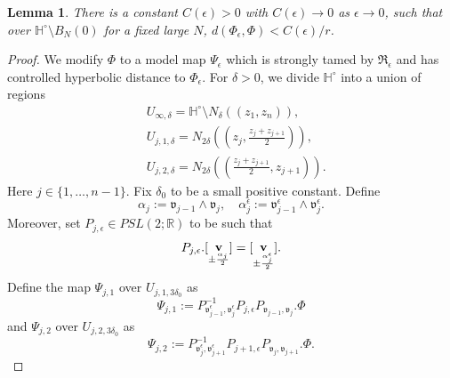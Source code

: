 \documentclass[a4paper,11pt]{amsart}
\newtheorem{lemma}[theorem]{Lemma}
\theoremstyle{definition}
\numberwithin{equation}{section}
\newcommand{\R}{\mathbb{R}}
\newcommand{\mv} {\mathfrak v}
\newcommand{\mR} {\mathfrak R}
\DeclareMathOperator{\bv}{{\bf v}}
\begin{document}
\begin{lemma}\label{lem:finer control on Phi epsilon}
    There is a constant $C(\epsilon)>0$ with $C(\epsilon)\to0$ as $\epsilon\to0$, such that over $\mathbb{H}^\circ\setminus B_{N}(0)$ for a fixed large $N$, $d(\Phi_\epsilon,\Phi)<C(\epsilon)/r$.
\end{lemma}
\begin{proof}
    We modify $\Phi$ to a model map $\Psi_{\epsilon}$ which is strongly tamed by $\mR_\epsilon$ and has controlled hyperbolic distance to $\Phi_\epsilon$. For $\delta>0$, we divide $\mathbb{H}^\circ$ into a union of regions
    \begin{align*}
        &U_{\infty,\delta}=\mathbb{H}^\circ\setminus N_{\delta}((z_1,z_n)),\\
        &U_{j,1,\delta}=N_{2\delta}((z_j,\frac{z_j+z_{j+1}}{2})),\\
        &U_{j,2,\delta}=N_{2\delta}((\frac{z_j+z_{j+1}}{2},z_{j+1})).
    \end{align*}
    Here $j\in\{1,\ldots,n-1\}$. Fix $\delta_0$ to be a small positive constant. Define 
    $$\alpha_j:=\mv_{j-1}\wedge \mv_j,\quad \alpha_j^\epsilon:=\mv_{j-1}^\epsilon\wedge \mv_j^\epsilon.$$
    Moreover, set $P_{j,\epsilon}\in PSL(2;\R)$ to be such that  
    $$P_{j,\epsilon}.[\bv_{\pm\frac{\alpha_j}{2}}]=[\bv_{\pm\frac{\alpha_j^\epsilon}{2}}].$$
    Define the map $\Psi_{j,1}$ over $U_{j,1,3\delta_0}$ as 
    $$\Psi_{j,1}:=P_{\mv_{j-1}^\epsilon,\mv_j^\epsilon}^{-1}P_{j,\epsilon} P_{\mv_{j-1},\mv_j}.\Phi$$ 
    and $\Psi_{j,2}$ over $U_{j,2,3\delta_0}$ as $$\Psi_{j,2}:=P_{\mv_j^\epsilon,\mv_{j+1}^\epsilon}^{-1}P_{j+1,\epsilon}P_{\mv_j,\mv_{j+1}}.\Phi.$$
    

\end{proof}
\end{document}
